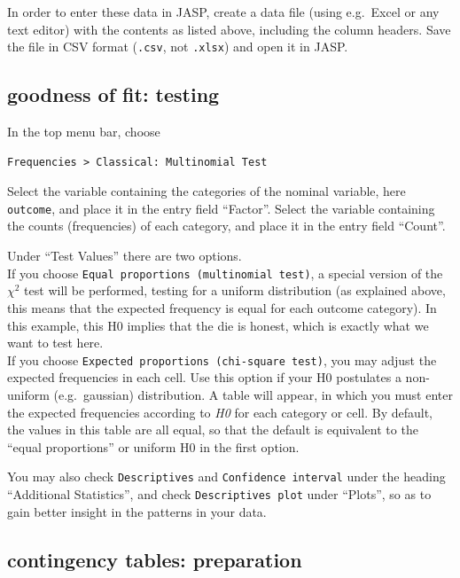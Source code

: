 \documentclass[
]{book}
\begin{document}
In order to enter these data in JASP, create a data file (using e.g.~Excel or any text editor) with the contents as listed above, including the column headers. Save the file in CSV format (\texttt{.csv}, not \texttt{.xlsx}) and open it in JASP.

\hypertarget{goodness-of-fit-testing-1}{%
\subsection{goodness of fit: testing}\label{goodness-of-fit-testing-1}}

In the top menu bar, choose

\begin{verbatim}
Frequencies > Classical: Multinomial Test
\end{verbatim}

Select the variable containing the categories of the nominal variable, here \texttt{outcome}, and place it in the entry field ``Factor''.
Select the variable containing the counts (frequencies) of each category, and place it in the entry field ``Count''.

Under ``Test Values'' there are two options.\\
If you choose \texttt{Equal\ proportions\ (multinomial\ test)}, a special version of the \(\chi^2\) test will be performed, testing for a uniform distribution (as explained above, this means that the expected frequency is equal for each outcome category). In this example, this H0 implies that the die is honest, which is exactly what we want to test here.\\
If you choose \texttt{Expected\ proportions\ (chi-square\ test)}, you may adjust the expected frequencies in each cell. Use this option if your H0 postulates a non-uniform (e.g.~gaussian) distribution. A table will appear, in which you must enter the expected frequencies according to \emph{H0} for each category or cell. By default, the values in this table are all equal, so that the default is equivalent to the ``equal proportions'' or uniform H0 in the first option.

You may also check \texttt{Descriptives} and \texttt{Confidence\ interval} under the heading ``Additional Statistics'', and check \texttt{Descriptives\ plot} under ``Plots'', so as to gain better insight in the patterns in your data.

\hypertarget{contingency-tables-preparation-1}{%
\subsection{contingency tables: preparation}\label{contingency-tables-preparation-1}}
\end{document}
